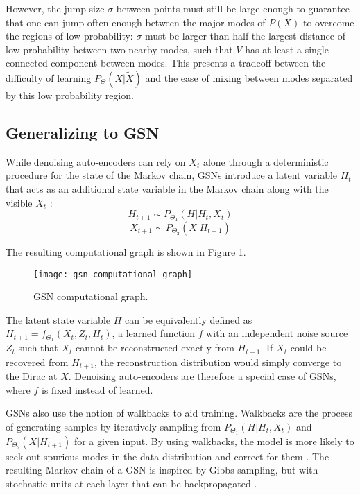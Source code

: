 However, the jump size \(\sigma\) between points must still be large enough to guarantee that one can jump often enough between the major modes of \(P(X)\) to overcome the regions of low probability: \(\sigma\) must be larger than half the largest distance of low probability between two nearby modes, such that \(V\) has at least a single connected component between modes. This presents a tradeoff between the difficulty of learning \(P_{\Theta}(X|\widetilde{X})\) and the ease of mixing between modes separated by this low probability region.


\subsection{Generalizing to GSN}

While denoising auto-encoders can rely on \(X_t\) alone through a deterministic procedure for the state of the Markov chain, GSNs introduce a latent variable \(H_t\) that acts as an additional state variable in the Markov chain along with the visible \(X_t\) \cite{gsn}:
\begin{equation}
	H_{t+1} \sim P_{\Theta_1}(H|H_t, X_t)
\end{equation}
\begin{equation}
	X_{t+1} \sim  P_{\Theta_2}(X|H_{t+1})
\end{equation}

The resulting computational graph is shown in Figure \ref{fig:gsn}.
\begin{figure}[h!]
  \centering
    \texttt{[image: gsn\_computational\_graph]}
\caption{GSN computational graph.}\label{fig:gsn}
\end{figure}

The latent state variable \(H\) can be equivalently defined as \(H_{t+1} = f_{\Theta_1}(X_t,Z_t,H_t)\), a learned function \(f\) with an independent noise source \(Z_t\) such that \(X_t\) cannot be reconstructed exactly from \(H_{t+1}\). If \(X_t\) could be recovered from \(H_{t+1}\), the reconstruction distribution would simply converge to the Dirac at \(X\). Denoising auto-encoders are therefore a special case of GSNs, where \(f\) is fixed instead of learned.

GSNs also use the notion of walkbacks to aid training. Walkbacks are the process of generating samples by iteratively sampling from \(P_{\Theta_1}(H|H_t, X_t)\) and \(P_{\Theta_2}(X|H_{t+1})\) for a given input. By using walkbacks, the model is more likely to seek out spurious modes in the data distribution and correct for them \cite{bengio13a}. The resulting Markov chain of a GSN is inspired by Gibbs sampling, but with stochastic units at each layer that can be backpropagated \cite{rezende14}.

